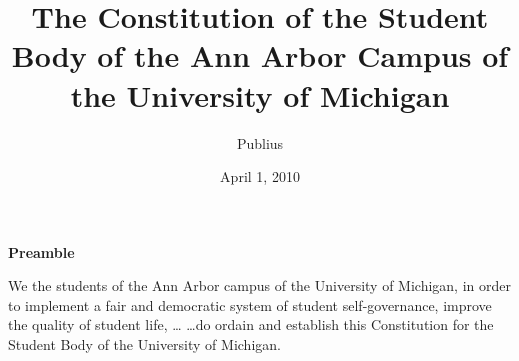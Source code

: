 \documentclass{constitution}
\begin{document}
	\title{The Constitution of the Student Body of the Ann Arbor Campus of the University of Michigan}
	\author{Publius}
	\date{April 1, 2010}
	\maketitle
	\tableofcontents
	\newpage

	\pagestyle{fancy}
	\headheight 35pt
	\thispagestyle{empty}
	\linenumbers
	
	\begin{center}
		\bfseries Preamble
	\end{center}

	We the students of the Ann Arbor campus of the University of Michigan, in order to implement a fair and democratic system of student self-governance, improve the quality of student life,  \ldots
	\ldots do ordain and establish this Constitution for the Student 
	Body of the University of Michigan.

	

	
	
	
	
	
	
	
	
	
\end{document}
